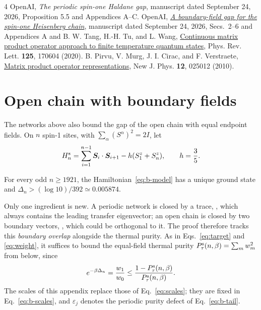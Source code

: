 \documentclass[aps,prl,reprint,amsmath,amssymb,nofootinbib,raggedbottom]{revtex4-2}
\begin{document}
\begin{thebibliography}{4}
OpenAI, \emph{The periodic spin-one Haldane gap}, manuscript dated
September 24, 2026, Proposition 5.5 and Appendices A--C.
OpenAI, \href{https://github.com/openai/math/blob/main/preprints/A-boundary-field-gap-for-the-spin-one-Heisenberg-chain-September-24-2026/paper.pdf}
{\emph{A boundary-field gap for the spin-one Heisenberg chain}},
manuscript dated September 24, 2026, Secs.~2--6 and Appendices A and B.
W. Tang, H.-H. Tu, and L. Wang,
\href{https://doi.org/10.1103/PhysRevLett.125.170604}
{Continuous matrix product operator approach to finite temperature quantum states},
Phys. Rev. Lett. \textbf{125}, 170604 (2020).
B. Pirvu, V. Murg, J. I. Cirac, and F. Verstraete,
\href{https://doi.org/10.1088/1367-2630/12/2/025012}
{Matrix product operator representations},
New J. Phys. \textbf{12}, 025012 (2010).
\end{thebibliography}

\clearpage
\appendix
\setcounter{secnumdepth}{2}
\section{Open chain with boundary fields}\label{app:open}
The networks above also bound the gap of the open chain with equal
endpoint fields. On $n$ spin-1 sites, with $\sum_\alpha(S^\alpha)^2=2I$, let
\begin{equation}
 H_n^{\mathrm{s}}=\sum_{i=1}^{n-1}\bm S_i\cdot\bm S_{i+1}
       -h(S_1^z+S_n^z),\qquad h=\frac35.
 \label{eq:b-model}
\end{equation}
\begin{theorem}\label{thm:b-gap}
For every odd $n\ge1921$, the Hamiltonian~\eqref{eq:b-model} has a unique
ground state and $\Delta_n>(\log10)/392\simeq0.005874$.
\end{theorem}
Only one ingredient is new. A periodic network is closed by a trace,
\tnchain[node=xvertex,ring]{,\cdots,}, which always contains the leading transfer
eigenvector; an open chain is closed by two boundary vectors,
\tnchain[node=xvertex,caps]{,\cdots,}, which could be orthogonal to it. The proof therefore
tracks this \emph{boundary overlap} alongside the thermal purity. As in
Eqs.~\eqref{eq:target} and \eqref{eq:weight}, it suffices to bound the
equal-field thermal purity $P_{\tau}^{\mathrm{s}}(n,\beta)=\sum_mw_m^2$ from below, since
\begin{equation}
 e^{-\beta\Delta_n}=\frac{w_1}{w_0}
 \le\frac{1-P_{\tau}^{\mathrm{s}}(n,\beta)}{P_{\tau}^{\mathrm{s}}(n,\beta)}.
 \label{eq:b-target}
\end{equation}
The scales of this appendix replace those of Eq.~\eqref{eq:scales}; they are
fixed in Eq.~\eqref{eq:b-scales}, and $\varepsilon_j$ denotes the periodic
purity defect of Eq.~\eqref{eq:b-tail}.
\end{document}
